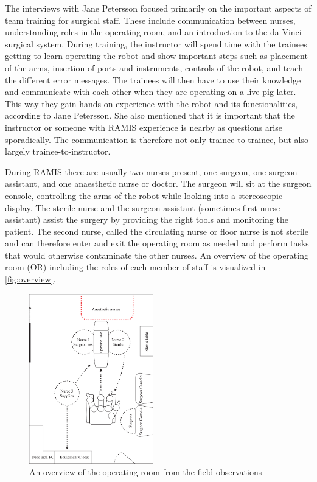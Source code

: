 \documentclass[conference]{IEEEtran}
\begin{document}
The interviews with Jane Petersson focused primarily on the important aspects of team training for surgical staff. These include communication between nurses, understanding roles in the operating room, and an introduction to the da Vinci surgical system. During training, the instructor will spend time with the trainees getting to learn operating the robot and show important steps such as placement of the arms, insertion of ports and instruments, controls of the robot, and teach the different error messages. The trainees will then have to use their knowledge and communicate with each other when they are operating on a live pig later. This way they gain hands-on experience with the robot and its functionalities, according to Jane Petersson. She also mentioned that it is important that the instructor or someone with RAMIS experience is nearby as questions arise sporadically. The communication is therefore not only trainee-to-trainee, but also largely trainee-to-instructor.

During RAMIS there are usually two nurses present, one surgeon, one surgeon assistant, and one anaesthetic nurse or doctor. The surgeon will sit at the surgeon console, controlling the arms of the robot while looking into a stereoscopic display. The sterile nurse and the surgeon assistant (sometimes first nurse assistant) assist the surgery by providing the right tools and monitoring the patient. The second nurse, called the circulating nurse or floor nurse is not sterile and can therefore enter and exit the operating room as needed and perform tasks that would otherwise contaminate the other nurses. An overview of the operating room (OR) including the roles of each member of staff is visualized in \autoref{fig:overview}.

\begin{figure}
 \centering
 \includegraphics[width=0.48\textwidth]{Figures/overview.pdf}
 \caption{An overview of the operating room from the field observations}
 \label{fig:overview}
 \end{figure}
 
\end{document}
